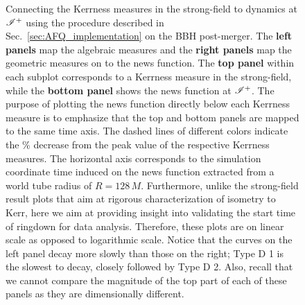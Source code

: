 {\begin{figure}
\caption{Connecting the Kerrness measures in the strong-field to dynamics at $\mathscr{I^+}$ using the procedure described in Sec.~\ref{sec:AFQ_implementation} on the BBH post-merger. The \textbf{left panels} map the algebraic measures and the \textbf{right panels} map the geometric measures on to the news function. The \textbf{top panel} within each subplot corresponds to a Kerrness measure in the strong-field, while the \textbf{bottom panel} shows the news function at $\mathscr{I^+}$. The purpose of plotting the news function directly below each Kerrness measure is to emphasize that the top and bottom panels are mapped to the same time axis. The dashed lines of different colors indicate the $\%$ decrease from the peak value of the respective Kerrness measures. The horizontal axis corresponds to the simulation coordinate time induced on the news function extracted from a world tube radius of $R=128\,M$. Furthermore, unlike the strong-field result plots that aim at rigorous characterization of isometry to Kerr, here we aim at providing insight into validating the start time of ringdown for data analysis. Therefore, these plots are on linear scale as opposed to logarithmic scale. Notice that the curves on the left panel decay more slowly than those on the right; Type D 1 is the slowest to decay, closely followed by Type D 2. Also, recall that we cannot compare the magnitude of the top part of each of these panels as they are dimensionally different. }
\label{fig:PostItPanel}
\end{figure}}

